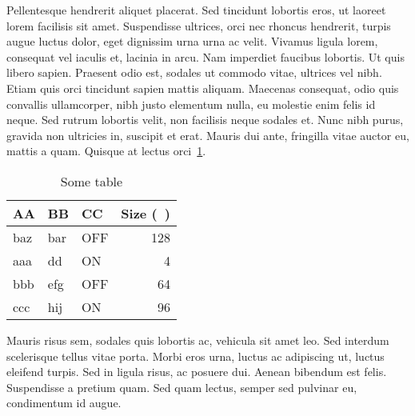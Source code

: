 Pellentesque hendrerit aliquet placerat. Sed tincidunt lobortis eros, ut laoreet lorem facilisis sit amet. Suspendisse ultrices, orci nec rhoncus hendrerit, turpis augue luctus dolor, eget dignissim urna urna ac velit. Vivamus ligula lorem, consequat vel iaculis et, lacinia in arcu. Nam imperdiet faucibus lobortis. Ut quis libero sapien. Praesent odio est, sodales ut commodo vitae, ultrices vel nibh. Etiam quis orci tincidunt sapien mattis aliquam. Maecenas consequat, odio quis convallis ullamcorper, nibh justo elementum nulla, eu molestie enim felis id neque. Sed rutrum lobortis velit, non facilisis neque sodales et. Nunc nibh purus, gravida non ultricies in, suscipit et erat. Mauris dui ante, fringilla vitae auctor eu, mattis a quam. Quisque at lectus orci~\ref{table:sometable}.

\begin{table}[ht]
	\begin{center}
		\caption{Some table}
		\begin{tabular}{@{}lllr@{}}
			\toprule
			AA & BB & CC & Size (\si{\kilo\byte})  \\
			\midrule
			baz & bar & OFF & 128 \\
			aaa & dd & ON & 4 \\
			bbb & efg & OFF & 64 \\
			ccc & hij & ON & 96 \\
			\bottomrule
		\end{tabular}
		\label{table:sometable}
	\end{center}
\end{table}

Mauris risus sem, sodales quis lobortis ac, vehicula sit amet leo. Sed interdum scelerisque tellus vitae porta. Morbi eros urna, luctus ac adipiscing ut, luctus eleifend turpis. Sed in ligula risus, ac posuere dui. Aenean bibendum est felis. Suspendisse a pretium quam. Sed quam lectus, semper sed pulvinar eu, condimentum id augue.~\cite{Doe:2009}


